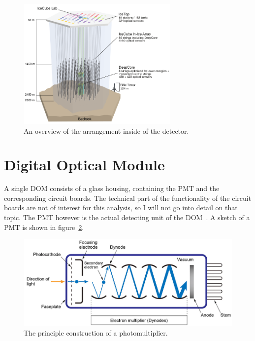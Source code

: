 \begin{figure}[htbp]
    \centering
    \includegraphics[width=0.7\textwidth]{content/pictures/icecube_sketch_01.png}
    \caption{An overview of the arrangement inside of the detector.}\label{fig:icecube_sketch_01}
\end{figure}

\section{Digital Optical Module}\label{sec:dom}

A single DOM consists of a glass housing, containing the PMT and the corresponding circuit boards. The technical part of the functionality of 
the circuit boards are not of interest for this analysis, so I will not go into detail on that topic. The PMT however is the actual detecting unit of 
the DOM~. A sketch of a PMT is shown in figure~\ref{fig:pmt01}.

\begin{figure}[htbp]
    \centering
    \includegraphics[width=\textwidth]{content/pictures/pmt_sketch_01.png}
    \caption{The principle construction of a photomultiplier.}\label{fig:pmt01}
\end{figure}


